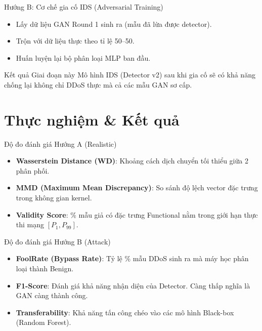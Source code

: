 \documentclass[aspectratio=169,11pt]{beamer}
\begin{document}
\begin{frame}{Hướng B: Cơ chế gia cố IDS (Adversarial Training)}
  \begin{itemize}
    \item Lấy dữ liệu GAN Round 1 sinh ra (mẫu đã lừa được detector).
    \item Trộn với dữ liệu thực theo tỉ lệ 50--50.
    \item Huấn luyện lại bộ phân loại MLP ban đầu.
  \end{itemize}
  \vspace{10pt}
  \begin{exampleblock}{Kết quả Giai đoạn này}
    Mô hình IDS (Detector v2) sau khi gia cố sẽ có khả năng chống lại không
    chỉ DDoS thực mà cả các mẫu GAN sơ cấp.
  \end{exampleblock}
\end{frame}

\section{Thực nghiệm \& Kết quả}

\begin{frame}{Độ đo đánh giá Hướng A (Realistic)}
  \begin{itemize}
    \item \textbf{Wasserstein Distance (WD)}: Khoảng cách dịch chuyển tối
          thiểu giữa 2 phân phối.
    \item \textbf{MMD (Maximum Mean Discrepancy)}: So sánh độ lệch vector
          đặc trưng trong không gian kernel.
    \item \textbf{Validity Score}:
          \% mẫu giả có đặc trưng Functional nằm trong giới hạn thực thi
          mạng $[P_1, P_{99}]$.
  \end{itemize}
\end{frame}

\begin{frame}{Độ đo đánh giá Hướng B (Attack)}
  \begin{itemize}\setlength\itemsep{8pt}
    \item \textbf{FoolRate (Bypass Rate)}: Tỷ lệ \% mẫu DDoS sinh ra mà
          máy học phân loại thành Benign.
    \item \textbf{F1-Score}: Đánh giá khả năng nhận diện của Detector.
          Càng thấp nghĩa là GAN càng thành công.
    \item \textbf{Transferability}: Khả năng tấn công chéo vào các mô hình
          Black-box (Random Forest).
  \end{itemize}
\end{frame}
\end{document}

